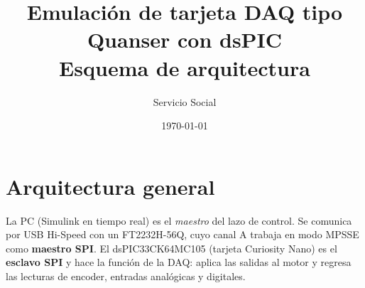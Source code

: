 \documentclass[11pt]{article}
\title{Emulación de tarjeta DAQ tipo Quanser con dsPIC\\
       \large Esquema de arquitectura}
\author{Servicio Social}
\date{\today}
\begin{document}
\maketitle

\section{Arquitectura general}

La PC (Simulink en tiempo real) es el \emph{maestro} del lazo de control. Se
comunica por USB Hi-Speed con un FT2232H-56Q, cuyo canal A trabaja en modo
MPSSE como \textbf{maestro SPI}. El dsPIC33CK64MC105 (tarjeta Curiosity Nano)
es el \textbf{esclavo SPI} y hace la función de la DAQ: aplica las salidas al
motor y regresa las lecturas de encoder, entradas analógicas y digitales.
\end{document}
